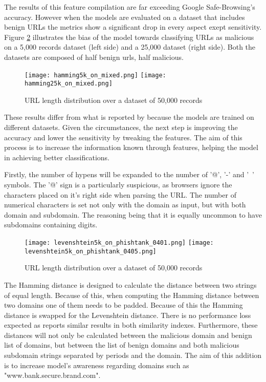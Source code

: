 	The results of this feature compilation are far exceeding Google Safe-Browsing's accuracy. However when the models are evaluated on a dataset that includes benign URLs the metrics show a significant drop in every aspect exept sensitivity. Figure \ref{fig:HAMMING_ON_MIXED} illustrates the bias of the model towards classifying URLs as malicious on a 5,000 records dataset (left side) and a 25,000 dataset (right side). Both the datasets are composed of half benign urls, half malicious.

	\begin{figure}[b]
		\centering
		\texttt{[image: hamming5k\_on\_mixed.png]}	\texttt{[image: hamming25k\_on\_mixed.png]}
		\caption{URL length distribution over a dataset of 50,000 records}
		\label{fig:HAMMING_ON_MIXED}
	\end{figure}

	These results differ from what is reported by \cite{SVM_SIMILARITY_INDEX} because the models are trained on different datasets. Given the circumstances, the next step is improving the accuracy and lower the sensitivity by tweaking the features. The aim of this process is to increase the information known through features, helping the model in achieving better classifications.

	Firstly, the number of hypens will be expanded to the number of '@', '-' and '~' symbols. The '@' sign is a particularly suspicious, as browsers ignore the characters placed on it's right side when parsing the URL. The number of numerical characters is set not only with the domain as input, but with both domain and subdomain. The reasoning being that it is equally uncommon to have subdomains containing digits.

	\begin{figure}[t]
		\centering
		\texttt{[image: levenshtein5k\_on\_phishtank\_0401.png]}	\texttt{[image: levenshtein5k\_on\_phishtank\_0405.png]}
		\caption{URL length distribution over a dataset of 50,000 records}
		\label{fig:HAMMING_ON_MIXED}
	\end{figure}

	The Hamming distance is designed to calculate the distance between two strings of equal length. Because of this, when computing the Hamming distance between two domains one of them needs to be padded. Because of this the Hamming distance is swapped for the Levenshtein distance. There is no performance loss expected as \cite{SVM_SIMILARITY_INDEX} reports similar results in both similarity indexes. Furthermore, these distances will not only be calculated between the malicious domain and benign list of domains, but between the list of benign domains and both malicious subdomain strings separated by periods and the domain. The aim of this addition is to increase model's awareness regarding domains such as "www.bank.secure.brand.com".

